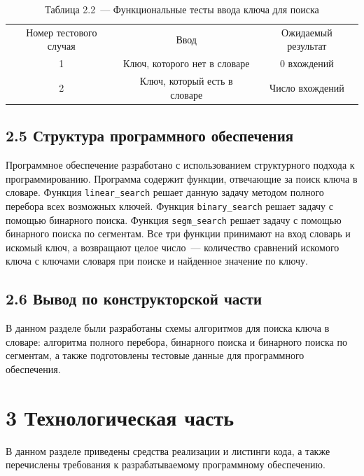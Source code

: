 \documentclass[12pt, a4paper]{report}
\begin{document}
	\begin{table} [H]
		\caption*{Таблица 2.2~--- Функциональные тесты ввода ключа для поиска}
		\begin{tabular}[l]{|c c c|}
			\hline
			Номер тестового случая & Ввод & Ожидаемый результат  \\
			
			1 & Ключ, которого нет в словаре & 0 вхождений \\\hline
			
			2 & Ключ, который есть в словаре & Число вхождений \\\hline
		\end{tabular}
	\end{table}
	
	\section*{2.5 Структура программного обеспечения}
	
	Программное обеспечение разработано с использованием структурного подхода к программированию. Программа содержит функции, отвечающие за поиск ключа в словаре. Функция \verb|linear_search| решает данную задачу методом полного перебора всех возможных ключей. Функция \verb|binary_search| решает задачу с помощью бинарного поиска. Функция \verb|segm_search| решает задачу с помощью бинарного поиска по сегментам. Все три функции принимают на вход словарь и искомый ключ, а возвращают целое число~--- количество сравнений искомого ключа с ключами словаря при поиске и найденное значение по ключу.
	
	\section*{2.6 Вывод по конструкторской части}
	
	В данном разделе были разработаны схемы алгоритмов для поиска ключа в словаре: алгоритма полного перебора, бинарного поиска и бинарного поиска по сегментам, а также подготовлены тестовые данные для программного обеспечения. 
	
	\chapter*{3 Технологическая часть}
	
	В данном разделе приведены средства реализации и листинги кода, а также перечислены требования к разрабатываемому программному обеспечению.
	
\end{document}
